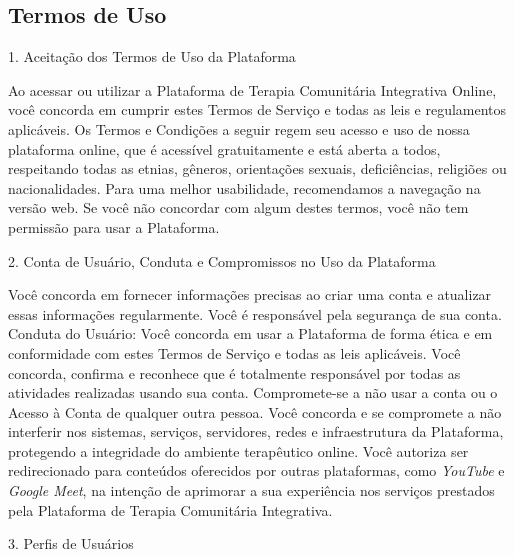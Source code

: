 \begin{apendicesenv}

\partapendices
     \chapter{Termos de Uso}
     \label{appendix:termos}
        1. Aceitação dos Termos de Uso da Plataforma 
        
        Ao acessar ou utilizar a Plataforma de Terapia Comunitária Integrativa Online, você concorda em cumprir estes Termos de Serviço e todas as leis e regulamentos aplicáveis. Os Termos e Condições a seguir regem seu acesso e uso de nossa plataforma online, que é acessível gratuitamente e está aberta a todos, respeitando todas as etnias, gêneros, orientações sexuais, deficiências, religiões ou nacionalidades. Para uma melhor usabilidade, recomendamos a navegação na versão web. Se você não concordar com algum destes termos, você não tem permissão para usar a Plataforma.
        
        2. Conta de Usuário, Conduta e Compromissos no Uso da Plataforma
        
        Você concorda em fornecer informações precisas ao criar uma conta e atualizar essas informações regularmente. Você é responsável pela segurança de sua conta.
        Conduta do Usuário: Você concorda em usar a Plataforma de forma ética e em conformidade com estes Termos de Serviço e todas as leis aplicáveis.
        Você concorda, confirma e reconhece que é totalmente responsável por todas as atividades realizadas usando sua conta. Compromete-se a não usar a conta ou o Acesso à Conta de qualquer outra pessoa.
        Você concorda e se compromete a não interferir nos sistemas, serviços, servidores, redes e infraestrutura da Plataforma, protegendo a integridade do ambiente terapêutico online.
        Você autoriza ser redirecionado para conteúdos oferecidos por outras plataformas, como \textit{YouTube} e \textit{Google Meet}, na intenção de aprimorar a sua experiência nos serviços prestados pela Plataforma de Terapia Comunitária Integrativa.
        
        3. Perfis de Usuários
        

\end{apendicesenv}

